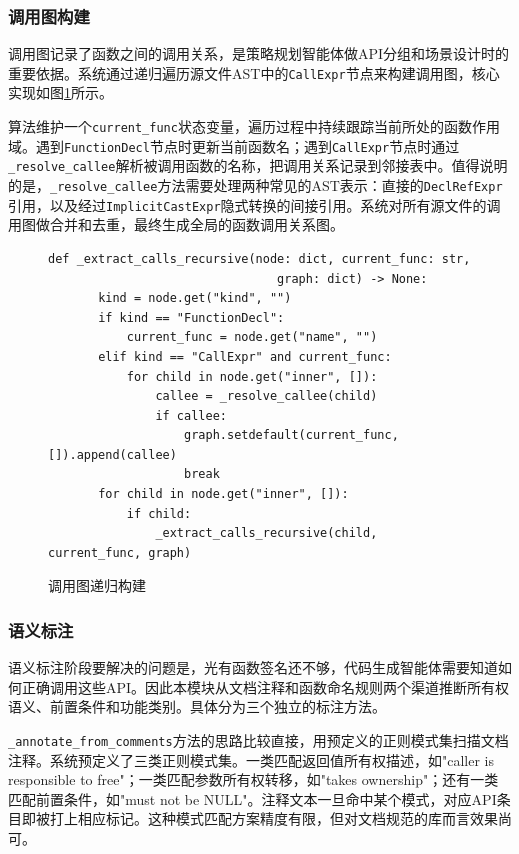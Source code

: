\subsubsection{调用图构建}

调用图记录了函数之间的调用关系，是策略规划智能体做API分组和场景设计时的重要依据。系统通过递归遍历源文件AST中的\texttt{CallExpr}节点来构建调用图，核心实现如图\ref{fig:call-graph}所示。

算法维护一个\texttt{current\_func}状态变量，遍历过程中持续跟踪当前所处的函数作用域。遇到\texttt{FunctionDecl}节点时更新当前函数名；遇到\texttt{CallExpr}节点时通过\texttt{\_resolve\_callee}解析被调用函数的名称，把调用关系记录到邻接表中。值得说明的是，\texttt{\_resolve\_callee}方法需要处理两种常见的AST表示：直接的\texttt{DeclRefExpr}引用，以及经过\texttt{ImplicitCastExpr}隐式转换的间接引用。系统对所有源文件的调用图做合并和去重，最终生成全局的函数调用关系图。

\begin{figure}[H]
    \centering
    \begin{lstlisting}[style=style@python]
   def _extract_calls_recursive(node: dict, current_func: str,
                                graph: dict) -> None:
       kind = node.get("kind", "")
       if kind == "FunctionDecl":
           current_func = node.get("name", "")
       elif kind == "CallExpr" and current_func:
           for child in node.get("inner", []):
               callee = _resolve_callee(child)
               if callee:
                   graph.setdefault(current_func, []).append(callee)
                   break
       for child in node.get("inner", []):
           if child:
               _extract_calls_recursive(child, current_func, graph)
    \end{lstlisting}
    \caption{调用图递归构建}
    \label{fig:call-graph}
\end{figure}

\subsubsection{语义标注}

语义标注阶段要解决的问题是，光有函数签名还不够，代码生成智能体需要知道如何正确调用这些API。因此本模块从文档注释和函数命名规则两个渠道推断所有权语义、前置条件和功能类别。具体分为三个独立的标注方法。

\texttt{\_annotate\_from\_comments}方法的思路比较直接，用预定义的正则模式集扫描文档注释。系统预定义了三类正则模式集。一类匹配返回值所有权描述，如"caller is responsible to free"；一类匹配参数所有权转移，如"takes ownership"；还有一类匹配前置条件，如"must not be NULL"。注释文本一旦命中某个模式，对应API条目即被打上相应标记。这种模式匹配方案精度有限，但对文档规范的库而言效果尚可。

